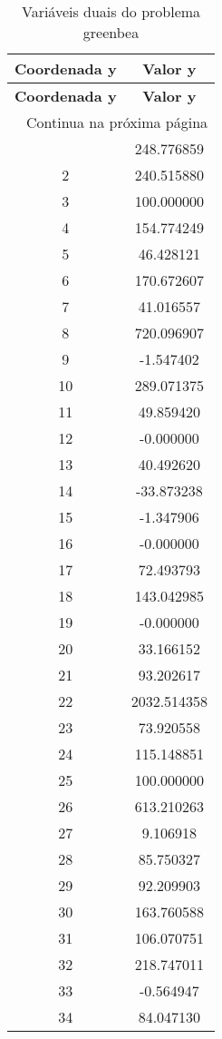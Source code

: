\documentclass[12pt]{article}
\begin{document}
\begin{longtable}{@{}cc@{}}
\caption{Variáveis duais do problema greenbea} \\
\toprule
\textbf{Coordenada y} & \textbf{Valor y} \\
\midrule
\endfirsthead

\toprule
\textbf{Coordenada y} & \textbf{Valor y} \\
\midrule
\endhead

\midrule \multicolumn{2}{r}{{Continua na próxima página}} \\ \midrule
\endfoot

\bottomrule
\endlastfoot
1 & 248.776859 \\
2 & 240.515880 \\
3 & 100.000000 \\
4 & 154.774249 \\
5 & 46.428121 \\
6 & 170.672607 \\
7 & 41.016557 \\
8 & 720.096907 \\
9 & -1.547402 \\
10 & 289.071375 \\
11 & 49.859420 \\
12 & -0.000000 \\
13 & 40.492620 \\
14 & -33.873238 \\
15 & -1.347906 \\
16 & -0.000000 \\
17 & 72.493793 \\
18 & 143.042985 \\
19 & -0.000000 \\
20 & 33.166152 \\
21 & 93.202617 \\
22 & 2032.514358 \\
23 & 73.920558 \\
24 & 115.148851 \\
25 & 100.000000 \\
26 & 613.210263 \\
27 & 9.106918 \\
28 & 85.750327 \\
29 & 92.209903 \\
30 & 163.760588 \\
31 & 106.070751 \\
32 & 218.747011 \\
33 & -0.564947 \\
34 & 84.047130 \\

\end{longtable}
\end{document}
